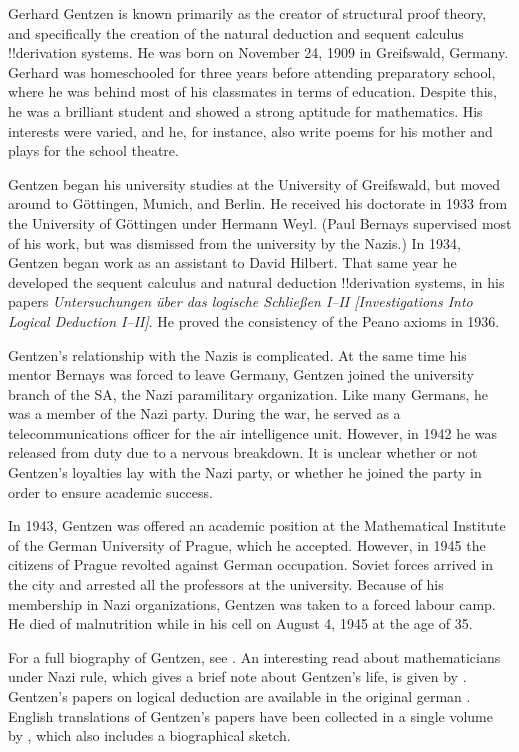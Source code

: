\documentclass[../../../include/open-logic-section]{subfiles}
\begin{document}


Gerhard Gentzen is known primarily as the creator of structural proof
theory, and specifically the creation of the natural deduction and
sequent calculus !!{derivation} systems. He was born on November 24, 1909 in
Greifswald, Germany. Gerhard was homeschooled for three years before
attending preparatory school, where he was behind most of his
classmates in terms of education. Despite this, he was a brilliant
student and showed a strong aptitude for mathematics. His interests
were varied, and he, for instance, also write poems for his mother and plays
for the school theatre.

Gentzen began his university studies at the University of Greifswald,
but moved around to G\"{o}ttingen, Munich, and Berlin. He received his
doctorate in 1933 from the University of G\"{o}ttingen under Hermann
Weyl.  (Paul Bernays supervised most of his work, but was dismissed
from the university by the Nazis.)  In 1934, Gentzen began work as an
assistant to David Hilbert. That same year he developed the sequent
calculus and natural deduction !!{derivation} systems, in his papers
\emph{Untersuchungen \"{u}ber das logische Schlie\ss en I--II
  [Investigations Into Logical Deduction I--II]}. He proved the
consistency of the Peano axioms in 1936.

Gentzen's relationship with the Nazis is complicated.  At the same
time his mentor Bernays was forced to leave Germany, Gentzen joined
the university branch of the SA, the Nazi paramilitary
organization. Like many Germans, he was a member of the Nazi
party. During the war, he served as a telecommunications officer for
the air intelligence unit. However, in 1942 he was released from duty
due to a nervous breakdown. It is unclear whether or not Gentzen's
loyalties lay with the Nazi party, or whether he joined the party in
order to ensure academic success.

In 1943, Gentzen was offered an academic position at the Mathematical
Institute of the German University of Prague, which he
accepted. However, in 1945 the citizens of Prague revolted against
German occupation. Soviet forces arrived in the city and arrested all
the professors at the university.  Because of his membership in Nazi
organizations, Gentzen was taken to a forced labour camp. He died of
malnutrition while in his cell on August 4, 1945 at the age of 35.

\begin{reading}
For a full biography of Gentzen, see \cite{Menzler-Trott2007}.  An
interesting read about mathematicians under Nazi rule, which gives a
brief note about Gentzen's life, is given by \cite{Segal2014}.
Gentzen's papers on logical deduction are available in the original
german \cite{Gentzen1935a,Gentzen1935b}.  English translations of
Gentzen's papers have been collected in a single volume by
\cite{Gentzen1969}, which also includes a biographical sketch.
\end{reading}
\end{document}
